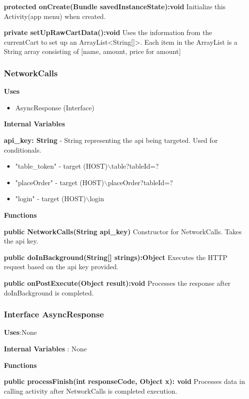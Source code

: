 \documentclass [10pt]{article}
\begin{document}
\textbf{protected onCreate(Bundle savedInstanceState):void}
Initialize this Activity(app menu) when created.

\textbf{private setUpRawCartData():void}
Uses the information from the currentCart to set up an ArrayList<String[]>. Each item in the ArrayList is a String array consisting of [name, amount, price for amount]

\subsubsection{NetworkCalls}

\textbf{Uses}
\begin{itemize}
	\item AsyncResponse (Interface)
\end{itemize}
\textbf{Internal Variables}

\textbf{api\_key: String} - String representing the api being targeted. Used for conditionals.

\begin{itemize}
	\item "table\_token" - target (HOST)$\backslash$table?tableId=?
	\item "placeOrder" - target (HOST)$\backslash$placeOrder?tableId=?
	\item "login" - target (HOST)$\backslash$login
\end{itemize}

\textbf{Functions}

\textbf{public NetworkCalls(String api\_key)}
Constructor for NetworkCalls. Takes the api key.

\textbf{public doInBackground(String[] strings):Object}
Executes the HTTP request based on the api key provided.

\textbf{public onPostExecute(Object result):void}
Processes the response after doInBackground is completed.

\subsubsection{Interface AsyncResponse}

\textbf{Uses}:None

\textbf{Internal Variables} : None

\textbf{Functions}

\textbf{public processFinish(int responseCode, Object x): void}
Processes data in calling activity after NetworkCalls is completed execution.
\end{document}
